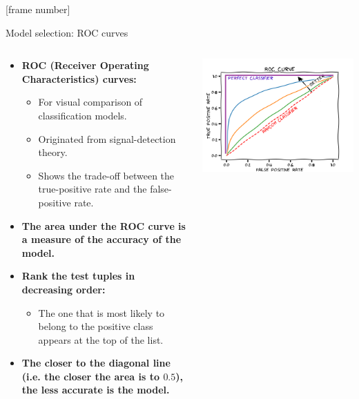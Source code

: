 \documentclass[aspectratio=169,t,table]{beamer}
\begin{document}
  {
    [frame number]
    \begin{frame}{Model selection: ROC curves}
      \begin{columns}
        \begin{column}{0.6\textwidth}
          \begin{itemize}
            \item \textbf{ROC (Receiver Operating Characteristics) curves:}
            \begin{itemize}
              \item For visual comparison of classification models.
              \item Originated from signal-detection theory.
              \item Shows the trade-off between the true-positive rate and the false-positive rate.
            \end{itemize}
            \item \textbf{The area under the ROC curve is a {\color{airforceblue}measure of the accuracy} of the model.}
            \item \textbf{{\color{airforceblue}Rank the test tuples} in decreasing order:}
            \begin{itemize}
              \item The one that is most likely to belong to the positive class appears at the top of the list.
            \end{itemize}
            \item \textbf{The closer to the diagonal line (i.e. the closer the area is to $0.5$), the less accurate is the model.}
          \end{itemize}
        \end{column}
        \begin{column}{0.4\textwidth}
          \vspace{-1cm}
          \centering
          \includegraphics[width=\textwidth]{img/roc-curve.png}

\end{column}
\end{columns}
\end{frame}}
\end{document}
